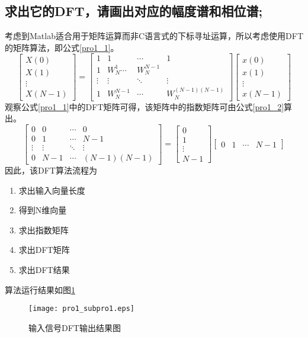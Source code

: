 \documentclass[fleqn,10pt]{SelfArx} %
\begin{document}
\begin{CJK}{UTF8}{gkai}
\subsection{求出它的DFT，请画出对应的幅度谱和相位谱;}
考虑到Matlab适合用于矩阵运算而非C语言式的下标寻址运算，所以考虑使用DFT的矩阵算法，即公式\ref{pro1_1}。
\begin{equation}
\left[\begin{array}{c}
X(0)\\
X(1)\\
\vdots\\
X(N-1)
\end{array}\right]
=
\left[\begin{array}{cccc}
1 & 1 & \cdots & 1\\
1 & W_N^1 \cdots & W_N^{N-1}\\
\vdots&\vdots&\ddots&\vdots\\
1 & W_N^{N-1} & \cdots & W_N^{(N-1)(N-1)}
\end{array}
\right]
\left[
\begin{array}{c}
  x(0)\\
  x(1)\\
  \vdots\\
  x(N-1)
\end{array}
\right]\label{pro1_1}
\end{equation}
观察公式\ref{pro1_1}中的DFT矩阵可得，该矩阵中的指数矩阵可由公式\ref{pro1_2}算出。
\begin{equation}
  \left[\begin{array}{cccc}
  0&0&\cdots&0\\
  0&1&\cdots&N-1\\
  \vdots&\vdots&\ddots&\vdots\\
  0&N-1&\cdots&(N-1)(N-1)
  \end{array}
  \right]
  =
  \left[\begin{array}{c}
  0\\
  1\\
  \vdots\\
  N-1
  \end{array}
  \right]
  \left[\begin{array}{cccc}
  0&1&\cdots&N-1
  \end{array}
  \right]\label{pro1_2}
\end{equation}
因此，该DFT算法流程为
\begin{enumerate}
  \item 求出输入向量长度
  \item 得到N维向量
  \item 求出指数矩阵
  \item 求出DFT矩阵
  \item 求出DFT结果
\end{enumerate}
算法运行结果如图\ref{pro1_fig1}
\begin{figure}
  \centering
  \texttt{[image: pro1\_subpro1.eps]}
  \caption{输入信号DFT输出结果图}
  \label{pro1_fig1}
\end{figure}


\end{CJK}
\end{document}
